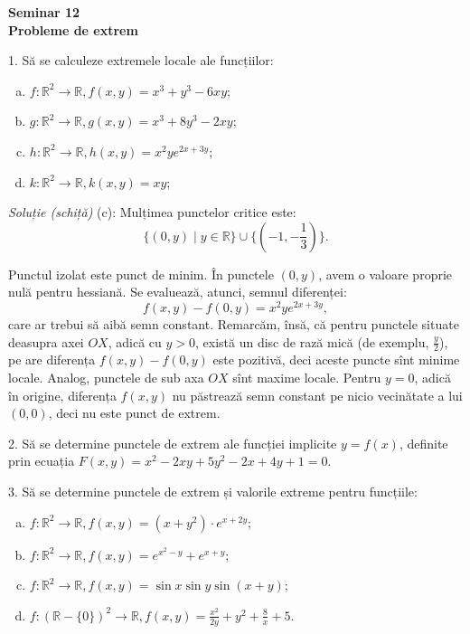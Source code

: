 \documentclass[11pt,a4paper]{article}
\newcommand\RR{\mathbb{R}}
\theoremstyle{dotless}
\theoremstyle{dotlessdr}
\begin{document}
\begin{center}
  {\large\textbf{Seminar 12 \\
    Probleme de extrem}}
\end{center}

1. Să se calculeze extremele locale ale funcțiilor:
\begin{enumerate}[(a)]
\item $f : \RR^2 \to \RR, f(x, y) = x^3 + y^3 - 6xy$;
\item $g : \RR^2 \to \RR, g(x, y) = x^3 + 8y^3 - 2xy$;
\item $h : \RR^2 \to \RR, h(x, y) = x^2ye^{2x + 3y}$;
\item $k : \RR^2 \to \RR, k(x, y) = xy$;
\end{enumerate}

\emph{Soluție (schiță)} (c): Mulțimea punctelor critice este:
\[
  \{(0, y) \mid y \in \RR \} \cup \{(-1, -\frac{1}{3}) \}.
\]

Punctul izolat este punct de minim. În punctele $(0, y)$, avem o valoare proprie
nulă pentru hessiană. Se evaluează, atunci, semnul diferenței:
\[
  f(x, y) - f(0, y) = x^2ye^{2x+3y},
\]
care ar trebui să aibă semn constant. Remarcăm, însă, că pentru punctele situate
deasupra axei $OX$, adică cu $y > 0$, există un disc de rază mică (de exemplu, $\frac{y}{2}$),
pe are diferența $f(x, y) - f(0, y)$ este pozitivă, deci aceste puncte sînt minime
locale. Analog, punctele de sub axa $OX$ sînt maxime locale. Pentru $y = 0$, adică
în origine, diferența $f(x, y)$ nu păstrează semn constant pe nicio vecinătate a
lui $(0, 0)$, deci nu este punct de extrem.

\vspace{1cm}

2. Să se determine punctele de extrem ale funcției implicite $y = f(x)$, definite prin
ecuația $F(x,y) = x^2 - 2xy + 5y^2 - 2x + 4y + 1 = 0$.

\vspace{1cm}

3. Să se determine punctele de extrem și valorile extreme pentru funcțiile:
\begin{enumerate}[(a)]
\item $f : \RR^2 \to \RR, f(x, y) = (x + y^2) \cdot e^{x + 2y}$;
\item $f : \RR^2 \to \RR, f(x, y) = e^{x^2 - y} + e^{x + y}$;
\item $f : \RR^2 \to \RR, f(x, y) = \sin x \sin y \sin (x + y)$;
\item $f : (\RR - \{0\})^2 \to \RR, f(x, y) = \frac{x^2}{2y} + y^2 + \frac{8}{x} + 5$.
\end{enumerate}
\end{document}
